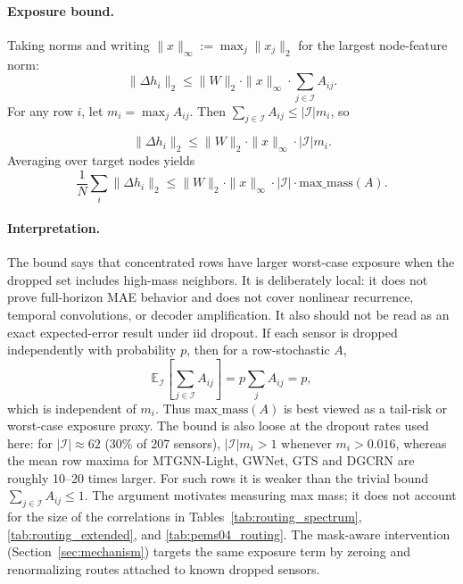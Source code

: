 \paragraph{Exposure bound.}
Taking norms and writing $\|x\|_\infty:=\max_j\|x_j\|_2$ for the largest
node-feature norm:
\begin{equation*}
  \|\Delta h_i\|_2 \leq \|W\|_2 \cdot \|x\|_\infty \cdot \sum_{j \in \mathcal{I}} A_{ij}.
\end{equation*}
For any row $i$, let $m_i=\max_j A_{ij}$. Then
$\sum_{j \in \mathcal{I}} A_{ij} \leq \lvert \mathcal{I} \rvert m_i$, so

\begin{equation*}
  \|\Delta h_i\|_2 \leq \|W\|_2 \cdot \|x\|_\infty \cdot
  \lvert \mathcal{I} \rvert m_i.
\end{equation*}
Averaging over target nodes yields
\begin{equation*}
  \frac{1}{N}\sum_i \|\Delta h_i\|_2
  \leq \|W\|_2 \cdot \|x\|_\infty \cdot
  \lvert \mathcal{I} \rvert \cdot \text{max\_mass}(A).
\end{equation*}

\paragraph{Interpretation.}
The bound says that concentrated rows have larger worst-case exposure when
the dropped set includes high-mass neighbors. It is deliberately local: it
does not prove full-horizon MAE behavior and does not cover nonlinear
recurrence, temporal convolutions, or decoder amplification. It also should
not be read as an exact expected-error result under iid dropout. If each
sensor is dropped independently with probability $p$, then for a row-stochastic
$A$,
\begin{equation*}
  \mathbb{E}_{\mathcal{I}}\left[\sum_{j\in\mathcal{I}} A_{ij}\right]
  = p\sum_j A_{ij}=p,
\end{equation*}
which is independent of $m_i$. Thus $\text{max\_mass}(A)$ is best viewed as a
tail-risk or worst-case exposure proxy. The bound is also loose at the dropout
rates used here: for $|\mathcal{I}|\approx62$ (30\% of 207 sensors),
$|\mathcal{I}|m_i>1$ whenever $m_i>0.016$, whereas the mean row maxima for
MTGNN-Light, GWNet, GTS and DGCRN are roughly 10--20 times larger. For such
rows it is weaker than the trivial bound $\sum_{j\in\mathcal{I}}A_{ij}\leq1$.
The argument motivates measuring max mass; it does not account for the size
of the correlations in Tables~\ref{tab:routing_spectrum},
\ref{tab:routing_extended}, and \ref{tab:pems04_routing}. The mask-aware intervention
(Section~\ref{sec:mechanism}) targets the same exposure term by zeroing and
renormalizing routes attached to known dropped sensors.

